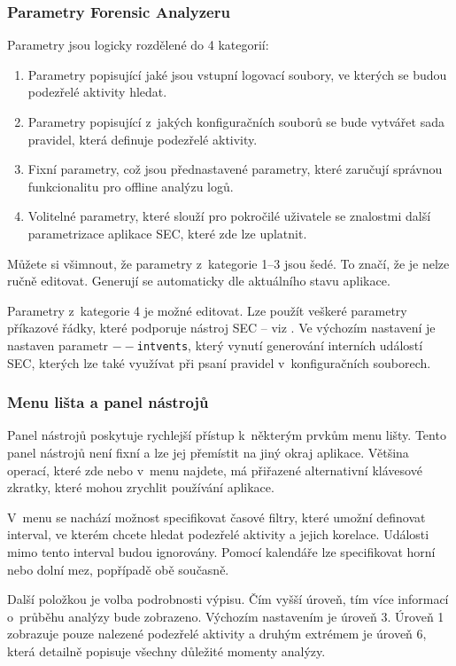 \documentclass[thesis=B,czech]{FITthesis}[2012/06/26]
\begin{document}
\subsubsection{Parametry Forensic Analyzeru}
Parametry jsou logicky rozdělené do 4 kategorií:
\begin{enumerate}
	\item Parametry popisující jaké jsou vstupní logovací soubory, ve kterých se budou podezřelé aktivity hledat.
	\item Parametry popisující z~jakých konfiguračních souborů se bude vytvářet sada pravidel, která definuje podezřelé aktivity.
	\item Fixní parametry, což jsou přednastavené parametry, které zaručují správnou funkcionalitu pro offline analýzu logů.
	\item Volitelné parametry, které slouží pro pokročilé uživatele se znalostmi další parametrizace aplikace SEC, které zde lze uplatnit. 
\end{enumerate}

Můžete si všimnout, že parametry z~kategorie 1--3 jsou šedé. To značí, že je nelze ručně editovat. Generují se automaticky dle aktuálního stavu aplikace.

Parametry z~kategorie 4 je možné editovat. Lze použít veškeré parametry příkazové řádky, které podporuje nástroj SEC -- viz \cite{secProgram, secManPage}. Ve výchozím nastavení je nastaven parametr \texttt{$--$intvents}, který vynutí generování interních událostí SEC, kterých lze také využívat při psaní pravidel v~konfiguračních souborech.

\subsubsection{Menu lišta a panel nástrojů}
Panel nástrojů poskytuje rychlejší přístup k~některým prvkům menu lišty. Tento panel nástrojů není fixní a lze jej přemístit na jiný okraj aplikace. Většina operací, které zde nebo v~menu najdete, má přiřazené alternativní klávesové zkratky, které mohou zrychlit používání aplikace.

V~menu se nachází možnost specifikovat časové filtry, které umožní definovat interval, ve kterém chcete hledat podezřelé aktivity a jejich korelace. Události mimo tento interval budou ignorovány.
Pomocí kalendáře lze specifikovat horní nebo dolní mez, popřípadě obě současně.

Další položkou je volba podrobnosti výpisu. Čím vyšší úroveň, tím více informací o~průběhu analýzy bude zobrazeno. Výchozím nastavením je úroveň 3. Úroveň 1 zobrazuje pouze nalezené podezřelé aktivity a druhým extrémem je úroveň 6, která detailně popisuje všechny důležité momenty analýzy.
\end{document}
